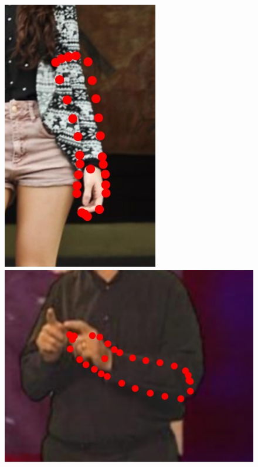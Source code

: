 \begin{figure}
    \includegraphics[height=\ofh]{resources/Annotation_Correction/Suplementory_Meterial/ExFit/0005}
    \hfill
    \includegraphics[height=\ofh]{resources/Annotation_Correction/Suplementory_Meterial/ExFit/0006}
    \hfill

\end{figure}
